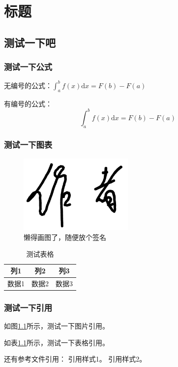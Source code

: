 
\chapter{标题}

\section{测试一下吧}

\subsection{测试一下公式}

无编号的公式：$\int_a^b f(x)\mathrm{d}x=F(b)-F(a)$

有编号的公式：
\begin{equation}
    \int_a^b f(x)\mathrm{d}x=F(b)-F(a)
\end{equation}

\subsection{测试一下图表}

\begin{figure}[htbp]
    \centering
    \includegraphics[width=0.5\textwidth]{signatures/author.png}
    \caption{懒得画图了，随便放个签名}
    \label{fig:example}
\end{figure}

\begin{table}[htbp]
    \centering
    \caption{测试表格}
    \begin{tabular}{|c|c|c|}
        \hline
        列1  & 列2  & 列3  \\
        \hline
        数据1 & 数据2 & 数据3 \\
        \hline
    \end{tabular}
    \label{tab:example}
\end{table}

\subsection{测试一下引用}

如图\ref{fig:example}所示，测试一下图片引用。

如表\ref{tab:example}所示，测试一下表格引用。

还有参考文件引用：
引用样式1\cite{example2025}。
引用样式2\parencite{example2025}。
